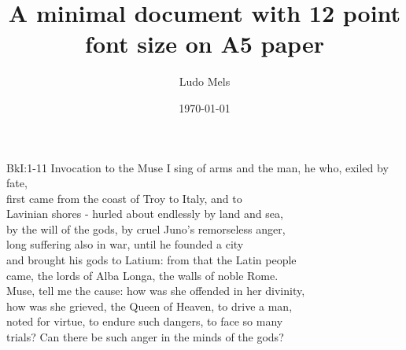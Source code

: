 \documentclass[12pt, a5paper]{minimal}
\title{A minimal document with 12 point font size on A5 paper}
\author{Ludo Mels}
\date{\today}
\begin{document}
{BkI:1-11 Invocation to the Muse}
I sing of arms and the man, he who, exiled by fate,\\
first came from the coast of Troy to Italy, and to\\
Lavinian shores - hurled about endlessly by land and sea,\\
by the will of the gods, by cruel Juno's remorseless anger,\\
long suffering also in war, until he founded a city\\
and brought his gods to Latium: from that the Latin people\\
came, the lords of Alba Longa, the walls of noble Rome.\\
Muse, tell me the cause: how was she offended in her divinity,\\
how was she grieved, the Queen of Heaven, to drive a man,\\
noted for virtue, to endure such dangers, to face so many\\
trials? Can there be such anger in the minds of the gods?
\end{document}
